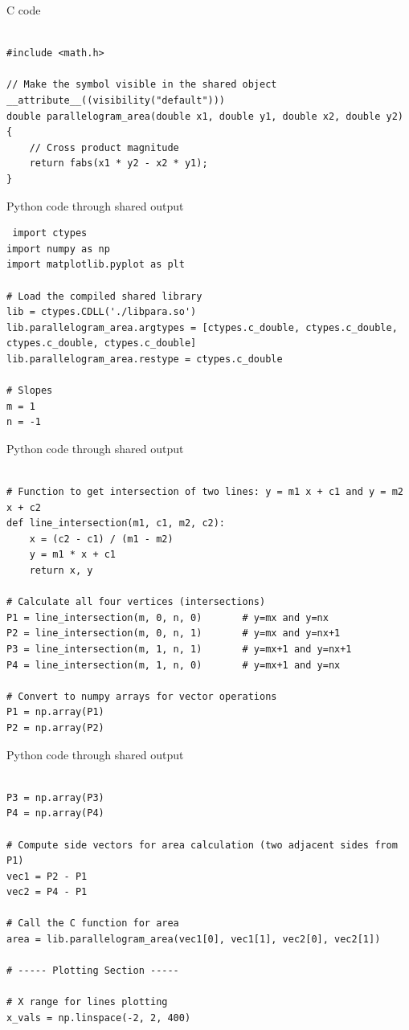 \documentclass{beamer}
\begin{document}
  \begin{frame}[fragile]{C code}
\begin{lstlisting}

#include <math.h>

// Make the symbol visible in the shared object
__attribute__((visibility("default")))
double parallelogram_area(double x1, double y1, double x2, double y2) {
    // Cross product magnitude
    return fabs(x1 * y2 - x2 * y1);
}

 \end{lstlisting}
\end{frame}
\begin{frame}[fragile]{Python code through shared output}
\begin{lstlisting}
 import ctypes
import numpy as np
import matplotlib.pyplot as plt

# Load the compiled shared library
lib = ctypes.CDLL('./libpara.so')
lib.parallelogram_area.argtypes = [ctypes.c_double, ctypes.c_double, ctypes.c_double, ctypes.c_double]
lib.parallelogram_area.restype = ctypes.c_double

# Slopes
m = 1
n = -1
 \end{lstlisting}
\end{frame}
\begin{frame}[fragile]{Python code through shared output}
\begin{lstlisting}

# Function to get intersection of two lines: y = m1 x + c1 and y = m2 x + c2
def line_intersection(m1, c1, m2, c2):
    x = (c2 - c1) / (m1 - m2)
    y = m1 * x + c1
    return x, y

# Calculate all four vertices (intersections)
P1 = line_intersection(m, 0, n, 0)       # y=mx and y=nx
P2 = line_intersection(m, 0, n, 1)       # y=mx and y=nx+1
P3 = line_intersection(m, 1, n, 1)       # y=mx+1 and y=nx+1
P4 = line_intersection(m, 1, n, 0)       # y=mx+1 and y=nx

# Convert to numpy arrays for vector operations
P1 = np.array(P1)
P2 = np.array(P2)
 \end{lstlisting}
\end{frame}
\begin{frame}[fragile]{Python code through shared output}
\begin{lstlisting}

P3 = np.array(P3)
P4 = np.array(P4)

# Compute side vectors for area calculation (two adjacent sides from P1)
vec1 = P2 - P1
vec2 = P4 - P1

# Call the C function for area
area = lib.parallelogram_area(vec1[0], vec1[1], vec2[0], vec2[1])

# ----- Plotting Section -----

# X range for lines plotting
x_vals = np.linspace(-2, 2, 400)
 \end{lstlisting}
\end{frame}
\end{document}
